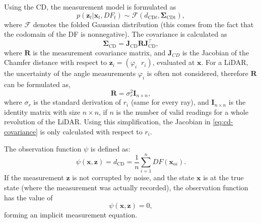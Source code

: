 Using the CD, the measurement model is formulated as
\begin{equation}
    p(\mathbf{\mathbf{z}}_t | \mathbf{x}_t, DF_t) \sim \mathcal{F}(d_{\text{CD}t},\boldsymbol\Sigma_{\text{CDt}}),
\end{equation}
where $\mathcal{F}$ denotes the folded Gaussian distribution (this comes from the fact that the codomain of the DF is nonnegative).
The covariance is calculated as
\begin{equation}\label{eq:cd-covariance}
    \boldsymbol\Sigma_{\text{CD}} = \mathbf{J}_{\text{CD}}\mathbf{R}\mathbf{J}_{\text{CD}}^{\top},
\end{equation}
where $\mathbf{R}$ is the measurement covariance matrix, and $\mathbf{J}_{CD}$ is the Jacobian of the
Chamfer distance with respect to $\mathbf{z}_i = (\varphi_i\;\;r_i)$,
evaluated at $\mathbf{x}$.
For a LiDAR, the uncertainty of the angle measurements $\varphi_i$ is often not considered,
therefore $\mathbf{R}$ can be formulated as,
\begin{equation}\label{eq:lidar-meas-covar}
    \mathbf{R} = \sigma_r^{2}\mathbf{I}_{n\times n},
\end{equation}
where $\sigma_r$ is the standard derivation of $r_i$ (same for every ray),
and $\mathbf{I}_{n\times n}$ is the identity matrix with size $n\times n$,
if $n$ is the number of valid readings for a whole revolution of the LiDAR.
Using this simplification, the Jacobian in \eqref{eq:cd-covariance}
is only calculated with respect to $r_i$.

The observation function $\psi$ is defined as:
\begin{equation}\label{eq:observation-function}
    \psi(\mathbf{x},\mathbf{z}) = d_{\text{CD}} = \frac{1}{n}\sum_{i=1}^{n}DF(\mathbf{x}_{\text{o}i}).
\end{equation}
If the measurement $\mathbf{z}$ is not corrupted by noise, and the state $\mathbf{x}$
is at the true state (where the measurement was actually recorded), the observation
function has the value of
\begin{equation}\label{eq:impl-meas-eq}
    \psi(\mathbf{x},\mathbf{z}) = 0,
\end{equation}
forming an implicit measurement equation.


